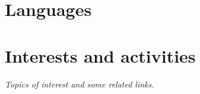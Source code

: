 \documentclass[10pt,a4paper,sans]{moderncv} %
\begin{document}
\section{Languages}



\section{Interests and activities}
\begin{center}
\textit{Topics of interest and some related links.}
\end{center}
\vspace*{-2mm}
\end{document}
